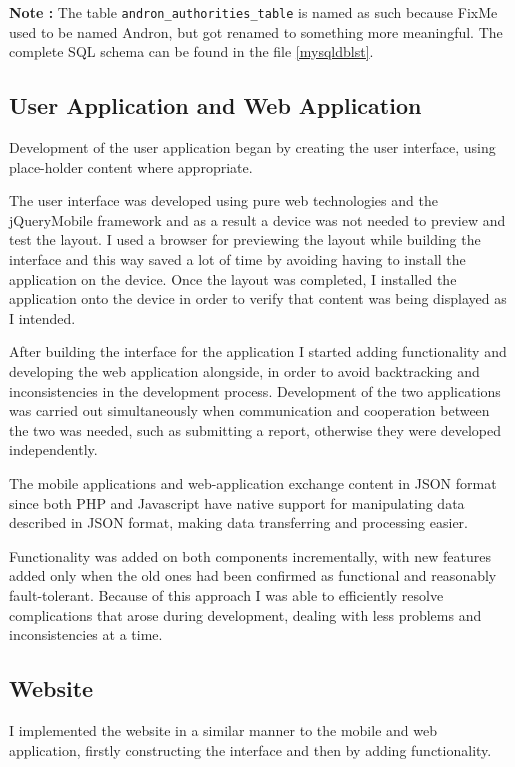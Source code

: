 \documentclass[12pt]{ecsproject}     %
\begin{document}
\textbf{Note : } The table \texttt{andron\_authorities\_table} is named as such because FixMe used to be named Andron, but got renamed to something more meaningful. The complete SQL schema can be found in the file \ref{mysqldblst}.

\subsection{User Application and Web Application}
Development of the user application began by creating the user interface, using place-holder content where appropriate.

The user interface was developed using pure web technologies and the jQueryMobile framework and as a result a device was not needed to preview and test the layout. I used a browser for previewing the layout while building the interface and this way saved a lot of time by avoiding having to install the application on the device. Once the layout was completed, I installed the application onto the device in order to verify that content was being displayed as I intended.

After building the interface for the application I started adding functionality and developing the web application alongside, in order to avoid backtracking and inconsistencies in the development process. Development of the two applications was carried out simultaneously when communication and cooperation between the two was needed, such as submitting a report, otherwise they were developed independently.

The mobile applications and web-application exchange content in JSON format since both PHP and Javascript have native support for manipulating data described in JSON format, making  data transferring and processing easier.

Functionality was added on both components incrementally, with new features added only when the old ones had been confirmed as functional and reasonably fault-tolerant. Because of this approach I was able to efficiently resolve complications that arose during development, dealing with less problems and inconsistencies at a time.

\subsection{Website}
I implemented the website in a similar manner to the mobile and web application, firstly constructing the interface and then by adding functionality.
\end{document}

